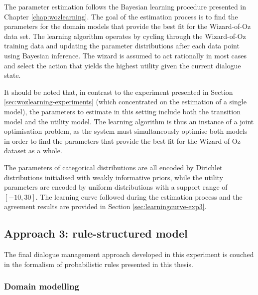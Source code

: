 The parameter estimation follows the Bayesian learning procedure presented in Chapter \ref{chap:wozlearning}. The goal of the estimation process is to find the parameters for the domain models that provide the best fit for the Wizard-of-Oz data set. The learning algorithm operates by cycling through the Wizard-of-Oz training data and updating the parameter distributions after each data point using Bayesian inference. The wizard is assumed to act rationally in most cases and select the action that yields the highest utility given the current dialogue state. 

It should be noted that, in contrast to the experiment presented in Section \ref{sec:wozlearning-experiments} (which concentrated on the estimation of a single model), the parameters to estimate in this setting include both the transition model and the utility model.  The learning algorithm is thus an instance of a joint optimisation problem, as the system must simultaneously optimise both models in order to find the parameters that provide the best fit for the Wizard-of-Oz dataset as a whole. 

The parameters of categorical distributions are all encoded by Dirichlet distributions initialised with weakly informative priors, while the utility parameters are encoded by uniform distributions with a support range of $[-10, 30]$.  The learning curve followed during the estimation process and the agreement results are provided in Section \ref{sec:learningcurve-exp3}.


\subsection{Approach 3: rule-structured model}

The final dialogue management approach developed in this experiment is couched in the formalism of probabilistic rules presented in this thesis.  


\subsubsection*{Domain modelling}

